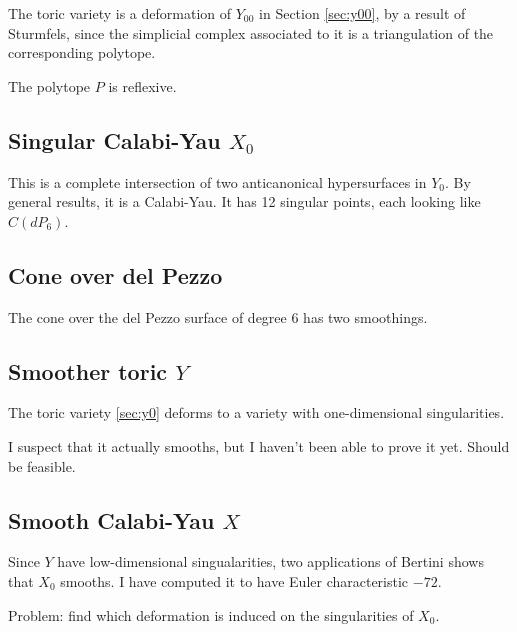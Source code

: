 \documentclass[11pt, english]{article}
\begin{document}
The toric variety is a deformation of $Y_{00}$ in Section \ref{sec:y00}, by a result of Sturmfels, since the simplicial complex associated to it is a triangulation of the corresponding polytope. 

The polytope $P$ is reflexive.

\subsection{Singular Calabi-Yau $X_0$}
\label{sec:x0}

This is a complete intersection of two anticanonical hypersurfaces in $Y_0$. By general results, it is a Calabi-Yau. It has 12 singular points, each looking like $C(dP_6)$.

\subsection{Cone over del Pezzo}
\label{sec:cdp6}

The cone over the del Pezzo surface of degree $6$ has two smoothings.

\subsection{Smoother toric $Y$}
\label{sec:y}

The toric variety \ref{sec:y0} deforms to a variety with one-dimensional singularities.

\begin{remark}
I suspect that it actually smooths, but I haven't been able to prove it yet. Should be feasible.
\end{remark}

\subsection{Smooth Calabi-Yau $X$}

Since $Y$ have low-dimensional singualarities, two applications of Bertini shows that $X_0$ smooths. I have computed it to have Euler characteristic $-72$.

Problem: find which deformation is induced on the singularities of $X_0$. 
\end{document}
